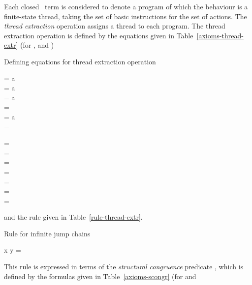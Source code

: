 \documentclass[fleqn]{llncs}
\begin{document}
Each closed \PGA\ term is considered to denote a program of which the
behaviour is a finite-state thread, taking the set  of basic
instructions for the set  of actions.
The \emph{thread extraction} operation  assigns a thread to
each program.
The thread extraction operation is defined by the equations given in
Table~\ref{axioms-thread-extr} (for ,  and
)\begin{table}[!t]
\caption{Defining equations for thread extraction operation}
\label{axioms-thread-extr}
\begin{eqntbl}
\begin{eqncol}
 = a \bapf \DeadEnd \\
 = a \bapf {} \\
 = a \bapf \DeadEnd \\
 =
 \\
 = a \bapf \DeadEnd \\
 =
\end{eqncol}
\qquad
\begin{eqncol}
 = \DeadEnd \\
 = \DeadEnd \\
 =  \\
 = \DeadEnd \\
 =  \\
\extr{\halt} = \Stop \\
 = \Stop
\end{eqncol}
\end{eqntbl}
\end{table}
and the rule given in Table~\ref{rule-thread-extr}.\begin{table}[!t]
\caption{Rule for infinite jump chains}
\label{rule-thread-extr}
\begin{eqntbl}
\begin{eqncol}
x \scongr {} \conc y \Implies {} = \DeadEnd
\end{eqncol}
\end{eqntbl}
\end{table}
This rule is expressed in terms of the \emph{structural congruence}
predicate , which is defined by the formulas given in
Table~\ref{axioms-scongr} (for  and
\end{document}
